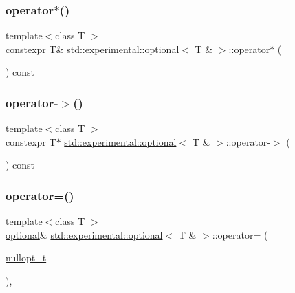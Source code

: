 \subsubsection{\texorpdfstring{operator$\ast$()}{operator*()}}
{\footnotesize\ttfamily template$<$class T $>$ \\
constexpr T\& \hyperlink{classstd_1_1experimental_1_1optional}{std\+::experimental\+::optional}$<$ T \& $>$\+::operator$\ast$ (\begin{DoxyParamCaption}{ }\end{DoxyParamCaption}) const\hspace{0.3cm}{\ttfamily [inline]}}

\mbox{\label{classstd_1_1experimental_1_1optional_3_01_t_01_6_01_4_af84c2ce49c2b8f8288b9ff92087bd2a5}} 
\subsubsection{\texorpdfstring{operator-\/$>$()}{operator->()}}
{\footnotesize\ttfamily template$<$class T $>$ \\
constexpr T$\ast$ \hyperlink{classstd_1_1experimental_1_1optional}{std\+::experimental\+::optional}$<$ T \& $>$\+::operator-\/$>$ (\begin{DoxyParamCaption}{ }\end{DoxyParamCaption}) const\hspace{0.3cm}{\ttfamily [inline]}}

\mbox{\label{classstd_1_1experimental_1_1optional_3_01_t_01_6_01_4_af8f513f05e0710ae389c77721e02c4b8}} 
\subsubsection{\texorpdfstring{operator=()}{operator=()}\hspace{0.1cm}{\footnotesize\ttfamily [1/3]}}
{\footnotesize\ttfamily template$<$class T $>$ \\
\hyperlink{classstd_1_1experimental_1_1optional}{optional}\& \hyperlink{classstd_1_1experimental_1_1optional}{std\+::experimental\+::optional}$<$ T \& $>$\+::operator= (\begin{DoxyParamCaption}\item[{\hyperlink{structstd_1_1experimental_1_1nullopt__t}{nullopt\+\_\+t}}]{ }\end{DoxyParamCaption})\hspace{0.3cm}{\ttfamily [inline]}, {\ttfamily [noexcept]}}

